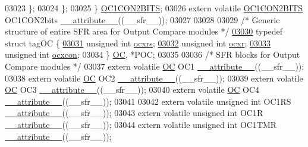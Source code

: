 \begin{DoxyCode}
03023     \};
03024   \};
03025 \} \hyperlink{a00014_d5/dd8/a00615}{OC1CON2BITS};
03026 \textcolor{keyword}{extern} \textcolor{keyword}{volatile} \hyperlink{a00014_d5/dd8/a00615}{OC1CON2BITS} OC1CON2bits \hyperlink{a00015_a493c46f03454991ccc5aa7a6e1dfb2a7}{\_\_attribute\_\_}((\_\_sfr\_\_));
03027 
03028 
03029 \textcolor{comment}{/* Generic structure of entire SFR area for Output Compare modules */}
\hypertarget{a00015_source_l03030}{}\hyperlink{a00014}{03030} \textcolor{keyword}{typedef} \textcolor{keyword}{struct }tagOC \{
\hypertarget{a00015_source_l03031}{}\hyperlink{a00014_ae0b9ec26b0c1cf6a041e02a5267bb9b3}{03031}         \textcolor{keywordtype}{unsigned} \textcolor{keywordtype}{int} \hyperlink{a00014_ae0b9ec26b0c1cf6a041e02a5267bb9b3}{ocxrs};
\hypertarget{a00015_source_l03032}{}\hyperlink{a00014_ac406e1c79f69cbfc0cbf6c31bffb7bb8}{03032}         \textcolor{keywordtype}{unsigned} \textcolor{keywordtype}{int} \hyperlink{a00014_ac406e1c79f69cbfc0cbf6c31bffb7bb8}{ocxr};
\hypertarget{a00015_source_l03033}{}\hyperlink{a00014_a4e64ca0c8cd27111d8f2a9cb69021129}{03033}         \textcolor{keywordtype}{unsigned} \textcolor{keywordtype}{int} \hyperlink{a00014_a4e64ca0c8cd27111d8f2a9cb69021129}{ocxcon};
03034 \} \hyperlink{a00014_dd/dc0/a00611}{OC}, *POC;
03035 
03036 \textcolor{comment}{/* SFR blocks for Output Compare modules */}
03037 \textcolor{keyword}{extern} \textcolor{keyword}{volatile} \hyperlink{a00014_dd/dc0/a00611}{OC} OC1 \hyperlink{a00015_a493c46f03454991ccc5aa7a6e1dfb2a7}{\_\_attribute\_\_}((\_\_sfr\_\_));
03038 \textcolor{keyword}{extern} \textcolor{keyword}{volatile} \hyperlink{a00014_dd/dc0/a00611}{OC} OC2 \hyperlink{a00015_a493c46f03454991ccc5aa7a6e1dfb2a7}{\_\_attribute\_\_}((\_\_sfr\_\_));
03039 \textcolor{keyword}{extern} \textcolor{keyword}{volatile} \hyperlink{a00014_dd/dc0/a00611}{OC} OC3 \hyperlink{a00015_a493c46f03454991ccc5aa7a6e1dfb2a7}{\_\_attribute\_\_}((\_\_sfr\_\_));
03040 \textcolor{keyword}{extern} \textcolor{keyword}{volatile} \hyperlink{a00014_dd/dc0/a00611}{OC} OC4 \hyperlink{a00015_a493c46f03454991ccc5aa7a6e1dfb2a7}{\_\_attribute\_\_}((\_\_sfr\_\_));
03041 
03042 \textcolor{keyword}{extern} \textcolor{keyword}{volatile} \textcolor{keywordtype}{unsigned} \textcolor{keywordtype}{int}  OC1RS \hyperlink{a00015_a493c46f03454991ccc5aa7a6e1dfb2a7}{\_\_attribute\_\_}((\_\_sfr\_\_));
03043 \textcolor{keyword}{extern} \textcolor{keyword}{volatile} \textcolor{keywordtype}{unsigned} \textcolor{keywordtype}{int}  OC1R \hyperlink{a00015_a493c46f03454991ccc5aa7a6e1dfb2a7}{\_\_attribute\_\_}((\_\_sfr\_\_));
03044 \textcolor{keyword}{extern} \textcolor{keyword}{volatile} \textcolor{keywordtype}{unsigned} \textcolor{keywordtype}{int}  OC1TMR \hyperlink{a00015_a493c46f03454991ccc5aa7a6e1dfb2a7}{\_\_attribute\_\_}((\_\_sfr\_\_));

\end{DoxyCode}
